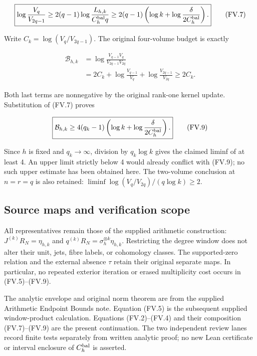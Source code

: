 \[
\boxed{\log\frac{V_q}{V_{2q-1}}
\ge2(q-1)\log\frac{L_{h,k}}{C_h^{\rm bal}q}
\ge2(q-1)\left(\log k+\log\frac{\delta}{2C_h^{\rm bal}}\right).}
\tag{FV.7}
\]

Write \(C_k=\log(V_q/V_{2q-1})\). The original four-volume budget is exactly

\[
\begin{aligned}
\mathcal B_{h,k}
&=\log\frac{V_{q-1}V_q}{V_{2q-1}V_{2q}}\\
&=2C_k+\log\frac{V_{q-1}}{V_q}
              +\log\frac{V_{2q-1}}{V_{2q}}\ge2C_k.
\end{aligned}
\tag{FV.8}
\]

Both last terms are nonnegative by the original rank-one kernel update. Substitution of (FV.7) proves

\[
\boxed{\mathcal B_{h,k}\ge
4(q_k-1)\left(\log k+\log\frac{\delta}{2C_h^{\rm bal}}\right).}
\tag{FV.9}
\]

Since \(h\) is fixed and \(q_k\to\infty\), division by \(q_k\log k\) gives the claimed liminf of at least 4. An upper limit strictly below 4 would already conflict with (FV.9); no such upper estimate has been obtained here. The two-volume conclusion at \(n=r=q\) is also retained: \(\liminf \log(V_q/V_{2q})/(q\log k)\ge2\).

\subsection[\hspace{0.4em}Source maps and verification scope]{Source maps and verification scope}\label{four-volume-source-maps-and-verification-scope}

All representatives remain those of the supplied arithmetic construction: \(J^{(k)}R_N=\eta_{h,k}\) and \(q^{(k)}R_N=\sigma_h^{\otimes k}\eta_{h,k}\). Restricting the degree window does not alter their unit, jets, fibre labels, or cohomology classes. The supported-zero relation and the external absence \(\tau\) retain their original separate maps. In particular, no repeated exterior iteration or erased multiplicity cost occurs in (FV.5)--(FV.9).

The analytic envelope and original norm theorem are from the supplied Arithmetic Endpoint Bounds note. Equation (FV.5) is the subsequent supplied window-product calculation. Equations (FV.2)--(FV.4) and their composition (FV.7)--(FV.9) are the present continuation. The two independent review lanes record finite tests separately from written analytic proof; no new Lean certificate or interval enclosure of \(C_h^{\rm bal}\) is asserted.
\endgroup
